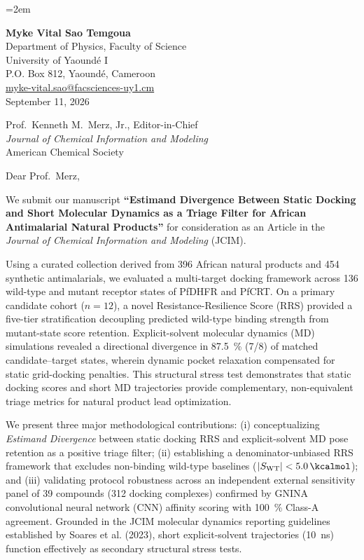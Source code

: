 \documentclass[11pt,letterpaper]{article}
\begin{document}
\emergencystretch=2em

\begin{flushleft}
\textbf{Myke Vital Sao Temgoua} \\
Department of Physics, Faculty of Science \\
University of Yaound\'{e} I \\
P.O. Box 812, Yaound\'{e}, Cameroon \\
\href{mailto:myke-vital.sao@facsciences-uy1.cm}{myke-vital.sao@facsciences-uy1.cm} \\[1.5em]
September 11, 2026
\end{flushleft}

\begin{flushleft}
Prof.\ Kenneth M.\ Merz, Jr., Editor-in-Chief \\
\textit{Journal of Chemical Information and Modeling} \\
American Chemical Society
\end{flushleft}

\vspace{0.5em}

\noindent Dear Prof.\ Merz,

We submit our manuscript \textbf{``Estimand Divergence Between Static Docking and Short Molecular Dynamics as a Triage Filter for African Antimalarial Natural Products''} for consideration as an Article in the \textit{Journal of Chemical Information and Modeling} (JCIM).

Using a curated collection derived from 396 African natural products and 454 synthetic antimalarials, we evaluated a multi-target docking framework across \num{136} wild-type and mutant receptor states of PfDHFR and PfCRT. On a primary candidate cohort ($n=\num{12}$), a novel Resistance-Resilience Score (RRS) provided a five-tier stratification decoupling predicted wild-type binding strength from mutant-state score retention. Explicit-solvent molecular dynamics (MD) simulations revealed a directional divergence in \qty{87.5}{\percent} (7/8) of matched candidate--target states, wherein dynamic pocket relaxation compensated for static grid-docking penalties. This structural stress test demonstrates that static docking scores and short MD trajectories provide complementary, non-equivalent triage metrics for natural product lead optimization.

We present three major methodological contributions: (i) conceptualizing \textit{Estimand Divergence} between static docking RRS and explicit-solvent MD pose retention as a positive triage filter; (ii) establishing a denominator-unbiased RRS framework that excludes non-binding wild-type baselines ($|S_{\mathrm{WT}}| < \qty{5.0}{\kcalmol}$); and (iii) validating protocol robustness across an independent external sensitivity panel of 39 compounds (\num{312} docking complexes) confirmed by GNINA convolutional neural network (CNN) affinity scoring with \qty{100}{\percent} Class-A agreement. Grounded in the JCIM molecular dynamics reporting guidelines established by Soares et al. (2023), short explicit-solvent trajectories (10~ns) function effectively as secondary structural stress tests.
\end{document}
